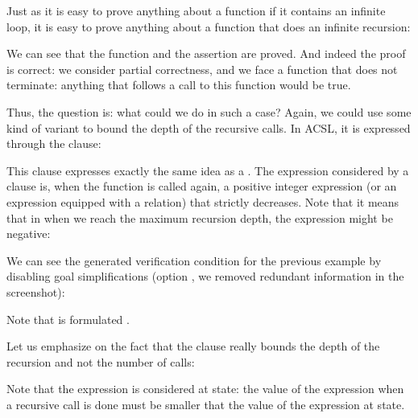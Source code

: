 Just as it is easy to prove anything about a function if it contains an
infinite loop, it is easy to prove anything about a function that does an
infinite recursion:






We can see that the function and the assertion are proved. And indeed the
proof is correct: we consider partial correctness, and we face a function
that does not terminate: anything that follows a call to this function would
be true.


Thus, the question is: what could we do in such a case? Again, we could use
some kind of variant to bound the depth of the recursive calls. In ACSL, it is
expressed through the  clause:




This clause expresses exactly the same idea as a .
The expression considered by a  clause is, when the
function is called again, a positive integer expression (or an expression
equipped with a relation) that strictly decreases. Note that it means that
in when we reach the maximum recursion depth, the expression might be negative:




We can see the generated verification condition for the previous example by
disabling goal simplifications (option , we removed
redundant information in the screenshot):



Note that  is formulated .


Let us emphasize on the fact that the  clause really
bounds the depth of the recursion and not the number of calls:






Note that the  expression is considered at
 state: the value of the expression when a recursive call is
done must be smaller that the value of the expression at  state.





